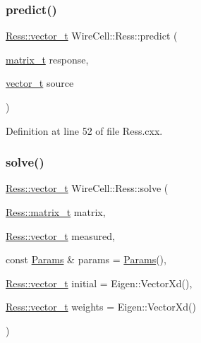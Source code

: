 \mbox{\label{namespace_wire_cell_1_1_ress_a367c0a2adb4a51f64136adbb2363a6c9}} 
\subsubsection{\texorpdfstring{predict()}{predict()}}
{\footnotesize\ttfamily \hyperlink{namespace_wire_cell_1_1_ress_a4f1e55ff97c04ad9ff5530f3f5e8c453}{Ress\+::vector\+\_\+t} Wire\+Cell\+::\+Ress\+::predict (\begin{DoxyParamCaption}\item[{\hyperlink{namespace_wire_cell_1_1_ress_a42b8962e4f04a1258a3393990acda985}{matrix\+\_\+t}}]{response,  }\item[{\hyperlink{namespace_wire_cell_1_1_ress_a4f1e55ff97c04ad9ff5530f3f5e8c453}{vector\+\_\+t}}]{source }\end{DoxyParamCaption})}



Definition at line 52 of file Ress.\+cxx.

\mbox{\label{namespace_wire_cell_1_1_ress_adfe5a11064a23319b6204e6af6a72cfd}} 
\subsubsection{\texorpdfstring{solve()}{solve()}}
{\footnotesize\ttfamily \hyperlink{namespace_wire_cell_1_1_ress_a4f1e55ff97c04ad9ff5530f3f5e8c453}{Ress\+::vector\+\_\+t} Wire\+Cell\+::\+Ress\+::solve (\begin{DoxyParamCaption}\item[{\hyperlink{namespace_wire_cell_1_1_ress_a42b8962e4f04a1258a3393990acda985}{Ress\+::matrix\+\_\+t}}]{matrix,  }\item[{\hyperlink{namespace_wire_cell_1_1_ress_a4f1e55ff97c04ad9ff5530f3f5e8c453}{Ress\+::vector\+\_\+t}}]{measured,  }\item[{const \hyperlink{struct_wire_cell_1_1_ress_1_1_params}{Params} \&}]{params = {\ttfamily \hyperlink{struct_wire_cell_1_1_ress_1_1_params}{Params}()},  }\item[{\hyperlink{namespace_wire_cell_1_1_ress_a4f1e55ff97c04ad9ff5530f3f5e8c453}{Ress\+::vector\+\_\+t}}]{initial = {\ttfamily Eigen\+:\+:VectorXd()},  }\item[{\hyperlink{namespace_wire_cell_1_1_ress_a4f1e55ff97c04ad9ff5530f3f5e8c453}{Ress\+::vector\+\_\+t}}]{weights = {\ttfamily Eigen\+:\+:VectorXd()} }\end{DoxyParamCaption})}



